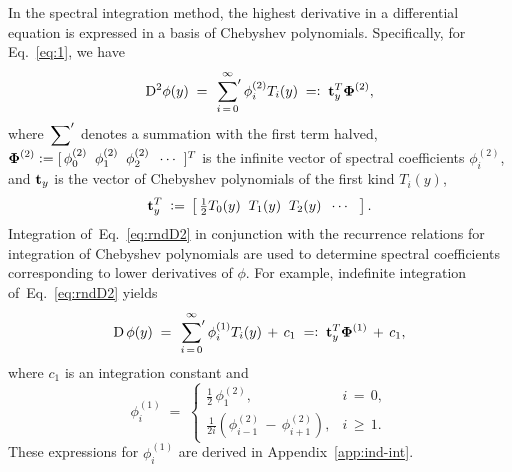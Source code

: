 \documentclass[%
secnumarabic,%
 amssymb, amsmath,%
 aps,prf,superscriptaddress,longbibliography
frontmatterverbose,
]{revtex4-2}
\newcommand{\DefinedAs}[0]{\mathrel{\mathop:}=}
\newcommand{\AsDefined}[0]{=\mathrel{\mathop:}}
\begin{document}
In the spectral integration method, the highest derivative in a differential equation is expressed in a basis of Chebyshev polynomials. Specifically, for Eq.~\eqref{eq:1}, we have
\begin{align}
  \D^2\phi (y) \;=\; 
  	\sideset{}{'}\sum_{i \, = \, 0}^{\infty} \phi_i^{(2)} T_i(y)
 	\; \AsDefined \;
	  \HH t_y^T \BB \Phi^{(2)},
	  \label{eq:rndD2}
\end{align}
where $\sideset{}{'}\sum$ denotes a summation with the first term halved, $\BB \Phi^{(2)} \DefinedAs [\,\phi^{(2)}_0\;\; \phi^{(2)}_1\;\; \phi^{(2)}_2 \;\; \cdots \;\; ]^T$ is the infinite vector of spectral coefficients $\phi_i^{(2)}$, and $\mathbf{t}_y$ is the vector of Chebyshev polynomials of the first kind $T_i(y)$,
\begin{equation}\label{eq:t}
  \HH t_y^T \; \DefinedAs \, \left[\,\tfrac{1}{2}T_0(y)\;\; T_1(y)\;\; T_2(y)\;\;  \cdots \;\;\; \right].
\end{equation}
Integration of~Eq.~\eqref{eq:rndD2} in conjunction with the recurrence relations for integration of Chebyshev polynomials are used to determine spectral coefficients corresponding to lower derivatives of $\phi$. For example, indefinite integration of~Eq.~\eqref{eq:rndD2} yields
\begin{align}
  \D\, \phi (y) \;=\; \sideset{}{'}\sum_{i \, = \, 0}^{\infty} \phi_i^{(1)} T_i(y) \,+\, c_1 
  \; \AsDefined \;
	  \HH t_y^T \BB \Phi^{(1)} \,+\, c_1, \label{eq:rndD1}
  \end{align}
where $c_1$ is an integration constant and %
\begin{equation}\label{ss}
  \phi_i^{(1)} \;=\;
  \begin{cases}
    \tfrac{1}{2} \, \phi_1^{(2)}, & i \, = \, 0,
    \\[0.1cm]
  \tfrac{1}{2i} (\phi_{i-1}^{(2)}\,-\,\phi_{i+1}^{(2)}), &  i \, \geq \, 1.
  \end{cases}
  \end{equation}
These expressions for $\phi_i^{(1)}$ are derived in Appendix~\ref{app:ind-int}. 
\end{document}
